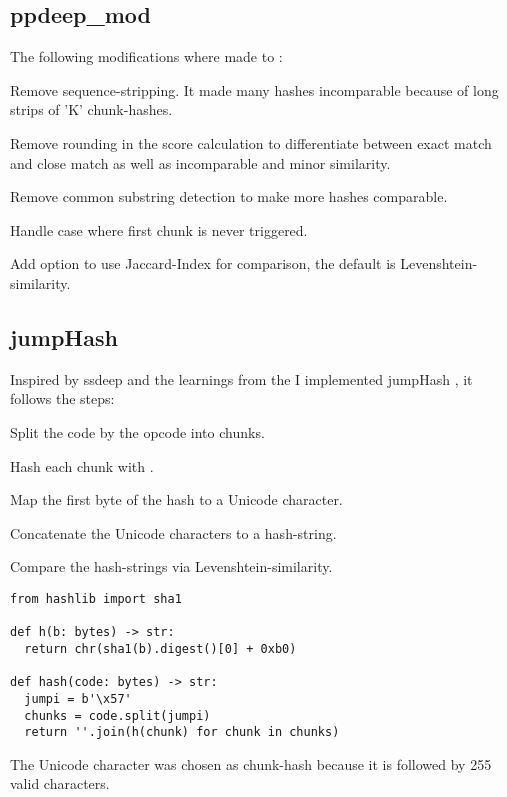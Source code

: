 \documentclass[../main.tex]{subfiles}
\begin{document}
\subsection{ppdeep\_mod}
The following modifications where made to :
\begin{ul}
  \item Remove sequence-stripping. It made many hashes incomparable because of long strips of 'K' chunk-hashes.
  \item Remove rounding in the score calculation to differentiate between exact match and close match as well as incomparable and minor similarity.
  \item Remove common substring detection to make more hashes comparable.
  \item Handle case where first chunk is never triggered.
  \item Add option to use Jaccard-Index for comparison, the default is Levenshtein-similarity.
\end{ul}

\subsection{jumpHash}
Inspired by ssdeep and the learnings from the  I implemented jumpHash \cite{ethereum-contract-similarity}, it follows the steps:
\begin{ol}
  \item Split the code by the opcode  into chunks.
  \item Hash each chunk with .
  \item Map the first byte of the  hash to a Unicode character.
  \item Concatenate the Unicode characters to a hash-string.
  \item Compare the hash-strings via Levenshtein-similarity.
\end{ol}
\begin{lstlisting}[style=pymd]
from hashlib import sha1

def h(b: bytes) -> str:
  return chr(sha1(b).digest()[0] + 0xb0)

def hash(code: bytes) -> str:
  jumpi = b'\x57'
  chunks = code.split(jumpi)
  return ''.join(h(chunk) for chunk in chunks)
\end{lstlisting}
The Unicode character  was chosen as  chunk-hash because it is followed by 255 valid characters.
\end{document}
